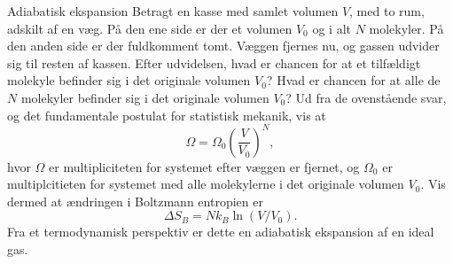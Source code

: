 \begin{opgave}{Adiabatisk ekspansion}
    Betragt en kasse med samlet volumen $V$, med to rum, adskilt af en væg. På den ene side er der et volumen $V_0$ og i alt $N$ molekyler. På den anden side er der fuldkomment tomt. Væggen fjernes nu, og gassen udvider sig til resten af kassen.
    \opg Efter udvidelsen, hvad er chancen for at et tilfældigt molekyle befinder sig i det originale volumen $V_0$?
    \opg Hvad er chancen for at alle de $N$ molekyler befinder sig i det originale volumen $V_0$?
    \opg Ud fra de ovenstående svar, og det fundamentale postulat for statistisk mekanik, vis at
    \[ \Omega=\Omega_0\left(\frac{V}{V_0}\right)^N, \]
    hvor $\Omega$ er multipliciteten for systemet efter væggen er fjernet, og $\Omega_0$ er multiplcitieten for systemet med alle molekylerne i det originale volumen $V_0$.
    \opg Vis dermed at ændringen i Boltzmann entropien er
    \[ \Delta S_B=Nk_B\ln(V/V_0). \]
    Fra et termodynamisk perspektiv er dette en adiabatisk ekspansion af en ideal gas.
\end{opgave}

